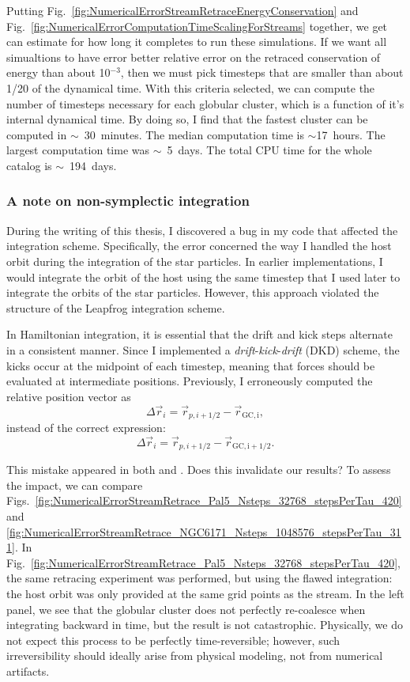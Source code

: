         Putting Fig.~\ref{fig:NumericalErrorStreamRetraceEnergyConservation} and Fig.~\ref{fig:NumericalErrorComputationTimeScalingForStreams} together, we get can estimate for how long it completes to run these simulations. If we want all simualtions to have error better relative error on the retraced conservation of energy than about 10$^{-3}$, then we must pick timesteps that are smaller than about 1/20 of the dynamical time. With this criteria selected, we can compute the number of timesteps necessary for each globular cluster, which is a function of it's internal dynamical time. By doing so, I find that the fastest cluster can be computed in $\sim$~30~minutes. The median computation time is $\sim$17~hours. The largest computation time was $\sim$~5~days. The total CPU time for the whole catalog is $\sim$~194~days. 

        \subsubsection{A note on non-symplectic integration}

        During the writing of this thesis, I discovered a bug in my code that affected the integration scheme. Specifically, the error concerned the way I handled the host orbit during the integration of the star particles. In earlier implementations, I would integrate the orbit of the host using the same timestep that I used later to integrate the orbits of the star particles. However, this approach violated the structure of the Leapfrog integration scheme.

        In Hamiltonian integration, it is essential that the drift and kick steps alternate in a consistent manner. Since I implemented a \textit{drift}-\textit{kick}-\textit{drift} (DKD) scheme, the kicks occur at the midpoint of each timestep, meaning that forces should be evaluated at intermediate positions. Previously, I erroneously computed the relative position vector as
        \[
        \Delta \vec{r}_i = \vec{r}_{p,i+1/2} - \vec{r}_\mathrm{GC,i},
        \]
        instead of the correct expression:
        \[
        \Delta \vec{r}_i = \vec{r}_{p,i+1/2} - \vec{r}_\mathrm{GC,i+1/2}.
        \]

        This mistake appeared in both \citet{2023A&A...673A..44F} and \citet{2025A&A...699A.289F}. Does this invalidate our results? To assess the impact, we can compare Figs.~\ref{fig:NumericalErrorStreamRetrace_Pal5_Nsteps_32768_stepsPerTau_420} and \ref{fig:NumericalErrorStreamRetrace_NGC6171_Nsteps_1048576_stepsPerTau_311}. In Fig.~\ref{fig:NumericalErrorStreamRetrace_Pal5_Nsteps_32768_stepsPerTau_420}, the same retracing experiment was performed, but using the flawed integration: the host orbit was only provided at the same grid points as the stream. In the left panel, we see that the globular cluster does not perfectly re-coalesce when integrating backward in time, but the result is not catastrophic. Physically, we do not expect this process to be perfectly time-reversible; however, such irreversibility should ideally arise from physical modeling, not from numerical artifacts.

